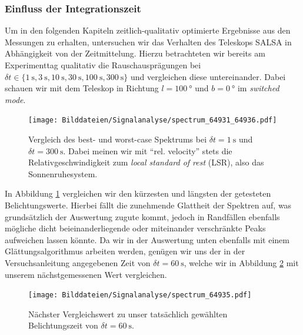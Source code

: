\documentclass[../../main.tex]{subfiles}
\begin{document}
    \subsubsection{Einfluss der Integrationszeit}
    Um in den folgenden Kapiteln zeitlich-qualitativ optimierte Ergebnisse aus den Messungen zu erhalten, untersuchen wir das Verhalten des Teleskops SALSA in Abhängigkeit von der Zeitmittelung. Hierzu betrachteten wir bereits am Experimenttag qualitativ die Rauschausprägungen bei $\delta t\in\{\SI{1}{\s},\SI{3}{\s},\SI{10}{\s},\SI{30}{\s},\SI{100}{\s},\SI{300}{\s}\}$ und vergleichen diese untereinander. Dabei schauen wir mit dem Teleskop in Richtung $l = \SI{100}{\degree}$ und $b = \SI{0}{\degree}$ im \emph{switched mode}.
    \begin{figure}[H]
        \centering
        \texttt{[image: Bilddateien/Signalanalyse/spectrum\_64931\_64936.pdf]}
        \caption{Vergleich des best- und worst-case Spektrums bei $\delta t = \SI{1}{\s}$ und $\delta t = \SI{300}{\s}$. Dabei meinen wir mit \enquote{rel. velocity} stets die Relativgeschwindigkeit zum \emph{local standard of rest} (LSR), also das Sonnenruhesystem.}
        \label{fig:bestworstcomp}
    \end{figure}
    In Abbildung \ref{fig:bestworstcomp} vergleichen wir den kürzesten und längsten der getesteten Belichtungswerte. Hierbei fällt die zunehmende Glattheit der Spektren auf, was grundsätzlich der Auswertung zugute kommt, jedoch in Randfällen ebenfalls mögliche dicht beieinanderliegende oder miteinander verschränkte Peaks aufweichen lassen könnte. Da wir in der Auswertung unten ebenfalls mit einem Glättungsalgorithmus arbeiten werden, genügen wir uns der in der Versuchsanleitung \cite{doc:SALSAStudentManual} angegebenen Zeit von $\delta t = \SI{60}{\s}$, welche wir in Abbildung \ref{fig:nexttime100} mit unserem nächstgemessenen Wert vergleichen.
    \begin{figure}[H]
        \centering
        \texttt{[image: Bilddateien/Signalanalyse/spectrum\_64935.pdf]}
        \caption{Nächster Vergleichswert zu unser tatsächlich gewählten Belichtungszeit von $\delta t = \SI{60}{\s}$.}
        \label{fig:nexttime100}
    \end{figure}

    
\end{document}
